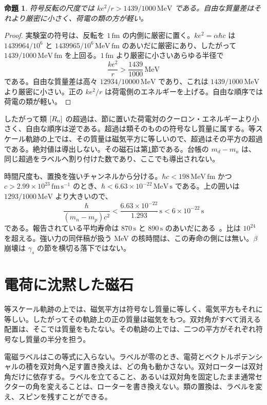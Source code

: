 \documentclass[a4paper]{article}
\newtheorem{proposition}[lemma]{命題}
\begin{document}
\begin{proposition}
\label{prop:sign}
符号反転の尺度では \(ke^{2}/r>1439/1000\,\mathrm{MeV}\) である。自由な質量差はそれより厳密に小さく、荷電の類の方が軽い。
\end{proposition}

\begin{proof}
実験室の符号は、反転を \(1\,\mathrm{fm}\) の内側に厳密に置く。\(ke^{2}=\alpha\hbar c\) は \(1439964/10^{6}\) と \(1439965/10^{6}\,\mathrm{MeV\,fm}\) のあいだに厳密にあり、したがって \(1439/1000\,\mathrm{MeV\,fm}\) を上回る。\(1\,\mathrm{fm}\) より厳密に小さいあらゆる半径で
\[
\frac{ke^{2}}{r}>\frac{1439}{1000}\,\mathrm{MeV}
\]
である。自由な質量差は高々 \(12934/10000\,\mathrm{MeV}\) であり、これは \(1439/1000\,\mathrm{MeV}\) より厳密に小さい。正の \(ke^{2}/r\) は荷電側のエネルギーを上げる。自由な順序では荷電の類が軽い。
\end{proof}

したがって類 \([R_{\rm n}]\) の超過は、節に置いた荷電対のクーロン・エネルギーより小さく、自由な順序は逆である。超過は類そのものの符号なし質量に属する。等スケール軌跡の上では、その質量は磁気平方に等しいので、超過はその平方の超過である。絶対値は導出しない。その磁石は第\ref{sec:moment}節である。台帳の \(m_d-m_u\) は、同じ超過をラベルへ割り付けた数であり、ここでも導出されない。

時間尺度も、置換を強いチャンネルから分ける。\(\hbar c<198\,\mathrm{MeV\,fm}\) かつ \(c>2.99\times 10^{23}\,\mathrm{fm\,s^{-1}}\) のとき、\(\hbar<6.63\times 10^{-22}\,\mathrm{MeV\,s}\) である。上の囲いは \(1293/1000\,\mathrm{MeV}\) より大きいので、
\[
\frac{\hbar}{(m_n-m_p)c^{2}}<\frac{6.63\times 10^{-22}}{1.293}\,\mathrm{s}<6\times 10^{-22}\,\mathrm{s}
\]
である。報告されている平均寿命は \(870\,\mathrm{s}\) と \(890\,\mathrm{s}\) のあいだにある~\cite{pdg2024}。比は \(10^{24}\) を超える。強い力の同伴稿が扱う MeV の核時間は、この寿命の側には無い。\(\beta\)崩壊は \(\gamma_s\) の節を横切る落下ではない。

\section{電荷に沈黙した磁石}
\label{sec:moment}

等スケール軌跡の上では、磁気平方は符号なし質量に等しく、電気平方もそれに等しい。したがってその軌跡上の正の質量は磁気をもつ。双対角がすべて消える配置は、そこでは質量をもたない。その軌跡の上では、二つの平方がそれぞれ符号なし質量の半分を担う。

電磁ラベルはこの等式に入らない。ラベルが零のとき、電荷とベクトルポテンシャルの積を双対角へ足す置き換えは、どの角も動かさない。双対ローターは双対角だけに依存する。ラベルを立てること、あるいは双対角を固定したまま通常セクターの角を変えることは、ローターを書き換えない。類の置換は、ラベルを変え、スピンを残すことができる。
\end{document}
